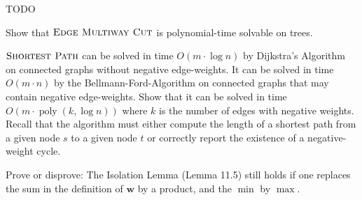 \documentclass{uebung_cs}
\begin{document}
TODO

\begin{exercise}
  Show that $\textsc{Edge Multiway Cut}$ is polynomial-time solvable on trees.
\end{exercise}

\begin{exercise}
  $\textsc{Shortest Path}$ can be solved in time $O(m\cdot \log n)$ by Dijkstra's Algorithm on connected graphs without negative edge-weights. It can be solved in time $O(m \cdot n)$ by the Bellmann-Ford-Algorithm on connected graphs that may contain negative edge-weights. Show that it can be solved in time $O(m\cdot \operatorname{poly}(k,\log n))$ where $k$ is the number of edges with negative weights. Recall that the algorithm must either compute the length of a shortest path from a given node $s$ to a given node $t$ or correctly report the existence of a negative-weight cycle.
\end{exercise}


\begin{exercise}
  Prove or disprove:
  The Isolation Lemma (Lemma 11.5) still holds if one replaces the sum in the definition of $\textbf{w}$ by a product,
  and the $\min$ by $\max$.
\end{exercise}
\end{document}
